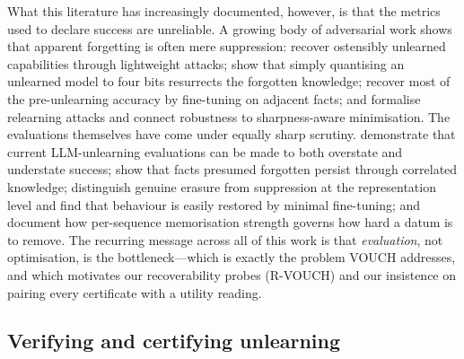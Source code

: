 What this literature has increasingly documented, however, is that the metrics used
to declare success are unreliable. A growing body of adversarial work shows that
apparent forgetting is often mere suppression:
\citet{lucki2024adversarial} recover ostensibly unlearned capabilities through
lightweight attacks; \citet{zhang2025quantization} show that simply quantising an
unlearned model to four bits resurrects the forgotten knowledge; \citet{deeb2024remove}
recover most of the pre-unlearning accuracy by fine-tuning on adjacent facts; and
\citet{fan2025relearning} formalise relearning attacks and connect robustness to
sharpness-aware minimisation. The evaluations themselves have come under equally
sharp scrutiny. \citet{feng2025existing} demonstrate that current LLM-unlearning
evaluations can be made to both overstate and understate success;
\citet{wei2025forget} show that facts presumed forgotten persist through correlated
knowledge; \citet{xu2026reversibility} distinguish genuine erasure from suppression
at the representation level and find that behaviour is easily restored by minimal
fine-tuning; and \citet{barbulescu2024each} document how per-sequence memorisation
strength governs how hard a datum is to remove. The recurring message across all of
this work is that \emph{evaluation}, not optimisation, is the bottleneck---which is
exactly the problem VOUCH addresses, and which motivates our recoverability probes
(R-VOUCH) and our insistence on pairing every certificate with a utility reading.

\subsection{Verifying and certifying unlearning}

